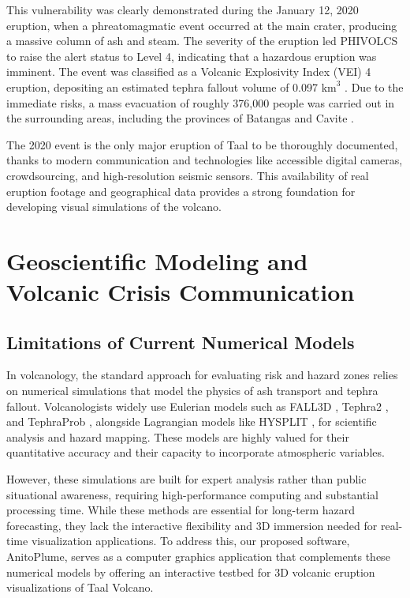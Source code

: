This vulnerability was clearly demonstrated during the January 12, 2020 eruption, when a phreatomagmatic event occurred at the main crater, producing a massive column of ash and steam.
The severity of the eruption led PHIVOLCS to raise the alert status to Level 4, indicating that a hazardous eruption was imminent.
The event was classified as a Volcanic Explosivity Index (VEI) 4 eruption, depositing an estimated tephra fallout volume of 0.097 $\text{km}^3$ \cite{balangue2022analysis}.
Due to the immediate risks, a mass evacuation of roughly 376,000 people was carried out in the surrounding areas, including the provinces of Batangas and Cavite \cite{renzo2020list, del2020impacts}.

The 2020 event is the only major eruption of Taal to be thoroughly documented, thanks to modern communication and technologies like accessible digital cameras, crowdsourcing, and high-resolution seismic sensors.
This availability of real eruption footage and geographical data provides a strong foundation for developing visual simulations of the volcano.


\section{Geoscientific Modeling and Volcanic Crisis Communication}
\subsection{Limitations of Current Numerical Models}
In volcanology, the standard approach for evaluating risk and hazard zones relies on numerical simulations that model the physics of ash transport and tephra fallout.
Volcanologists widely use Eulerian models such as FALL3D \cite{folch2009fall3d}, Tephra2 \cite{bonadonna2006probabilistic, connor2006inversion}, and TephraProb \cite{biass2016tephraprob}, alongside Lagrangian models like HYSPLIT \cite{stein2015noaa}, for scientific analysis and hazard mapping.
These models are highly valued for their quantitative accuracy and their capacity to incorporate atmospheric variables.

However, these simulations are built for expert analysis rather than public situational awareness, requiring high-performance computing and substantial processing time.
While these methods are essential for long-term hazard forecasting, they lack the interactive flexibility and 3D immersion needed for real-time visualization applications.
To address this, our proposed software, AnitoPlume, serves as a computer graphics application that complements these numerical models by offering an interactive testbed for 3D volcanic eruption visualizations of Taal Volcano.

